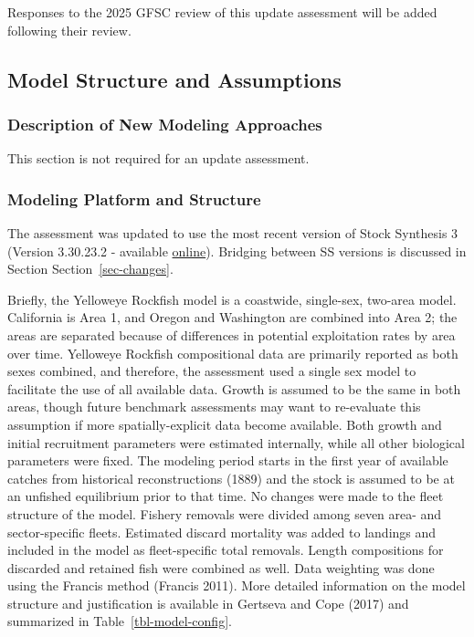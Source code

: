 \documentclass[
]{scrartcl}
\begin{document}
Responses to the 2025 GFSC review of this update assessment will be
added following their review.

\subsection{Model Structure and Assumptions}\label{sec-bridge}

\subsubsection{Description of New Modeling
Approaches}\label{description-of-new-modeling-approaches}

This section is not required for an update assessment.

\subsubsection{Modeling Platform and
Structure}\label{modeling-platform-and-structure}

The assessment was updated to use the most recent version of Stock
Synthesis 3 (Version 3.30.23.2 - available
\href{https://github.com/nmfs-ost/ss3-source-code/releases/tag/v3.30.23.2}{online}).
Bridging between SS versions is discussed in Section
Section~\ref{sec-changes}.

Briefly, the Yelloweye Rockfish model is a coastwide, single-sex,
two-area model. California is Area 1, and Oregon and Washington are
combined into Area 2; the areas are separated because of differences in
potential exploitation rates by area over time. Yelloweye Rockfish
compositional data are primarily reported as both sexes combined, and
therefore, the assessment used a single sex model to facilitate the use
of all available data. Growth is assumed to be the same in both areas,
though future benchmark assessments may want to re-evaluate this
assumption if more spatially-explicit data become available. Both growth
and initial recruitment parameters were estimated internally, while all
other biological parameters were fixed. The modeling period starts in
the first year of available catches from historical reconstructions
(1889) and the stock is assumed to be at an unfished equilibrium prior
to that time. No changes were made to the fleet structure of the model.
Fishery removals were divided among seven area- and sector-specific
fleets. Estimated discard mortality was added to landings and included
in the model as fleet-specific total removals. Length compositions for
discarded and retained fish were combined as well. Data weighting was
done using the Francis method (Francis 2011). More detailed information
on the model structure and justification is available in Gertseva and
Cope (2017) and summarized in Table~\ref{tbl-model-config}.
\end{document}
